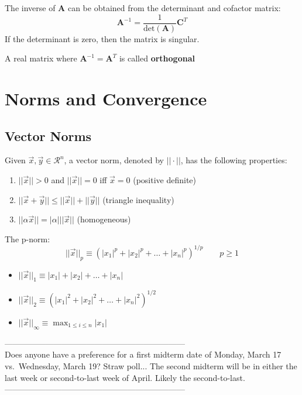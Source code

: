 \documentclass[12pt]{article}
\newcommand{\ve}[1]{\ensuremath{\mathbf{#1}}}
\begin{document}
The inverse of $\ve{A}$ can be obtained from the determinant and cofactor matrix:
%
\begin{equation}
\ve{A}^{-1} = \frac{1}{\text{det}(\ve{A})}\ve{C}^T \nonumber
\end{equation}
%
If the determinant is zero, then the matrix is singular.

A real matrix where $\ve{A}^{-1} = \ve{A}^T$ is called \textbf{orthogonal}


\section{Norms and Convergence}
\subsection{Vector Norms}
Given $\vec{x}, \vec{y} \in \mathcal{R}^n$, a vector norm, denoted by $|| \cdot ||$, has the following properties:
%
\begin{enumerate}
\item $||\vec{x}|| > 0$ and $||\vec{x}|| = 0$ iff $\vec{x} = 0$ (positive definite)
\item $||\vec{x} + \vec{y}|| \leq ||\vec{x}|| + ||\vec{y}||$ (triangle inequality)
\item $||\alpha \vec{x}|| = |\alpha| ||\vec{x}||$ (homogeneous)
\end{enumerate}

The p-norm:
%
\begin{equation}
||\vec{x}||_p \equiv (|x_1|^p + |x_2|^p + \dots + |x_n|^p)^{1/p} \qquad p \geq 1 \nonumber
\end{equation}
%
\begin{itemize}
\item $||\vec{x}||_1 \equiv |x_1| + |x_2| + \dots + |x_n|$
\item $||\vec{x}||_2 \equiv (|x_1|^2 + |x_2|^2 + \dots + |x_n|^2)^{1/2}$
\item $||\vec{x}||_{\infty} \equiv \displaystyle \max_{1 \leq i \leq n} |x_1|$
\end{itemize}

------------------------------------------------------------------\\
Does anyone have a preference for a first midterm date of Monday, March 17 vs.\ Wednesday, March 19? Straw poll... The second midterm will be in either the last week or second-to-last week of April. Likely the second-to-last.\\
------------------------------------------------------------------ 
\end{document}
